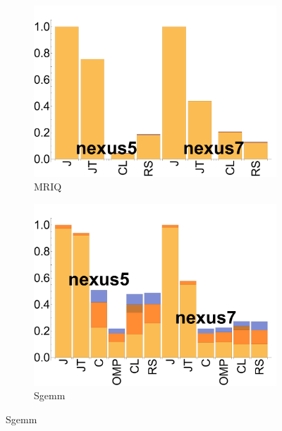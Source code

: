 \begin{figure}[ht]
  \begin{subfigure}[b]{0.25\textwidth}
      \centering
      \includegraphics[width=\textwidth]{data/bbattery_mriq.pdf}
      \caption{MRIQ} \label{fig:b_MRIQ}
  \end{subfigure}

  \begin{subfigure}[b]{0.25\textwidth}
      \centering
      \includegraphics[width=\textwidth]{data/bbattery_sgemm.pdf}
      \caption{Sgemm}\label{fig:b_Sgemm}
  \end{subfigure}


\end{figure}
